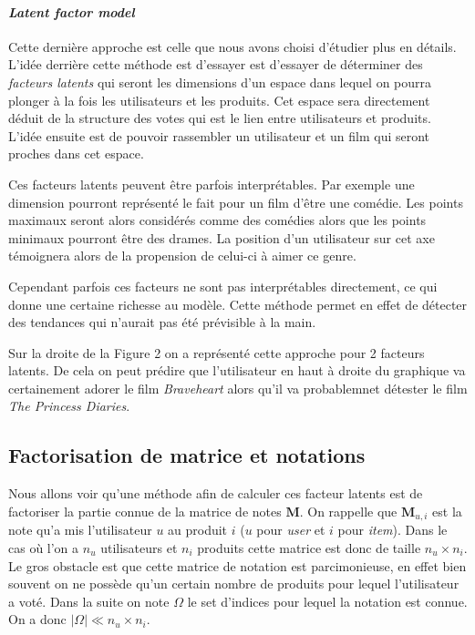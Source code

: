 \documentclass[10pt,a4paper]{article}
\begin{document}
\paragraph{\textit{Latent factor model}}

Cette dernière approche est celle que nous avons choisi d'étudier plus en détails. L'idée derrière cette méthode est d'essayer est d'essayer de déterminer des \textit{facteurs latents} qui seront les dimensions d'un espace dans lequel on pourra plonger à la fois les utilisateurs et les produits. Cet espace sera directement déduit de la structure des votes qui est le lien entre utilisateurs et produits. L'idée ensuite est de pouvoir rassembler un utilisateur et un film qui seront proches dans cet espace. 

Ces facteurs latents peuvent être parfois interprétables. Par exemple une dimension pourront représenté le fait pour un film d'être une comédie. Les points maximaux seront alors considérés comme des comédies alors que les points minimaux pourront être des drames. La position d'un utilisateur sur cet axe témoignera alors de la propension de celui-ci à aimer ce genre. 

Cependant parfois ces facteurs ne sont pas interprétables directement, ce qui donne une certaine richesse au modèle. Cette méthode permet en effet de détecter des tendances qui n'aurait pas été prévisible à la main.

Sur la droite de la Figure 2 on a représenté cette approche pour 2 facteurs latents. De cela on peut prédire que l'utilisateur en haut à droite du graphique va certainement adorer le film \textit{Braveheart} alors qu'il va probablemnet détester le film \textit{The Princess Diaries}.

\subsection{Factorisation de matrice et notations}

Nous allons voir qu'une méthode afin de calculer ces facteur latents est de factoriser la partie connue de la matrice de notes $\textbf{M}$. On rappelle que $\textbf{M}_{u,i}$ est la note qu'a mis l'utilisateur $u$ au produit $i$ ($u$ pour \textit{user} et $i$ pour \textit{item}). Dans le cas où l'on a $n_u$ utilisateurs et $n_i$ produits cette matrice est donc de taille $n_u\times n_i$. Le gros obstacle est que cette matrice de notation est parcimonieuse, en effet bien souvent on ne possède qu'un certain nombre de produits pour lequel l'utilisateur a voté. Dans la suite on note $\Omega$ le set d'indices pour lequel la notation est connue. On a donc $|\Omega|\ll n_u\times n_i$. 
\end{document}
